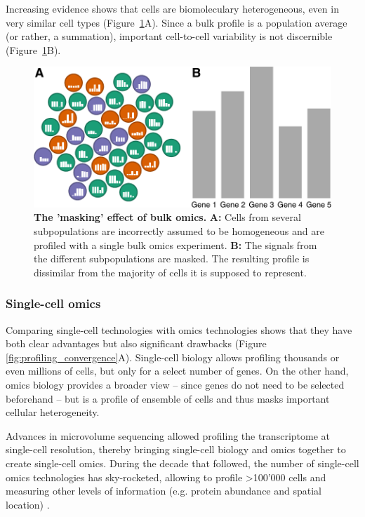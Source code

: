 Increasing evidence shows that cells are biomoleculary heterogeneous, even in very similar cell types\cite{hwang_singlecellrnasequencing_2018} (Figure~\ref{fig:bulk_vs_sc}A). Since a bulk profile is a population average (or rather, a summation), important cell-to-cell variability is not discernible (Figure~\ref{fig:bulk_vs_sc}B). 

\begin{figure}[htb!]
	\centering
	\includegraphics[width=\LARgefigure]{fig/bulk_vs_sc} 
	\caption{
		\textbf{The 'masking' effect of bulk omics.} 
		\textbf{A:} Cells from several subpopulations are incorrectly assumed to be homogeneous and are profiled with a single bulk omics experiment.
		\textbf{B:} The signals from the different subpopulations are masked. The resulting profile is dissimilar from the majority of cells it is supposed to represent.
	}
	\label{fig:bulk_vs_sc}
\end{figure}

\subsubsection{Single-cell omics}
Comparing single-cell technologies with omics technologies shows that they have both clear advantages but also significant drawbacks (Figure \ref{fig:profiling_convergence}A). Single-cell biology allows profiling thousands or even millions of cells, but only for a select number of genes. On the other hand, omics biology provides a broader view -- since genes do not need to be selected beforehand -- but is a profile of ensemble of cells and thus masks important cellular heterogeneity.

Advances in microvolume sequencing allowed profiling the transcriptome at single-cell resolution, thereby bringing single-cell biology and omics together to create single-cell omics. During the decade that followed, the number of single-cell omics technologies has sky-rocketed, allowing to profile >100'000 cells\cite{svensson_exponentialscalingsinglecell_2018} and measuring other levels of information (e.g. protein abundance and spatial location) \cite{moudgil_multimodalscrnaseq_2019}.


